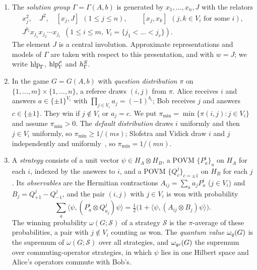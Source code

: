 \begin{definition}\label{def:lcs}
\leavevmode
\begin{enumerate}[label=(\alph*),itemsep=1pt]
\item The \emph{solution group} $\Gamma=\Gamma(A,b)$ is generated by $x_1,\dots,x_n,J$ with the relators
\begin{gather*}
x_j^2,\quad J^2,\quad [x_j,J]\ \ (1\le j\le n),\qquad [x_j,x_k]\ \ (j,k\in V_i\text{ for some }i),\\
J^{b_i}x_{j_1}x_{j_2}\cdots x_{j_r}\ \ (1\le i\le m,\ V_i=\{j_1<\dots<j_r\}).
\end{gather*}
The element $J$ is a central involution. Approximate representations and models of $\Gamma$ are taken with respect to this presentation,
and with $w=J$; we write $\operatorname{hlp}_\Gamma$, $\operatorname{hlp}^{\rho}_\Gamma$ and $h^{S}_\Gamma$.
\item In the game $G=G(A,b)$ with \emph{question distribution} $\pi$ on $\{1,\dots,m\}\times\{1,\dots,n\}$, a referee draws $(i,j)$ from
$\pi$. Alice receives $i$ and answers $a\in\{\pm1\}^{V_i}$ with $\prod_{j\in V_i}a_j=(-1)^{b_i}$; Bob receives $j$ and answers
$c\in\{\pm1\}$. They win if $j\notin V_i$ or $a_j=c$. We put $\pi_{\min}=\min\{\pi(i,j):j\in V_i\}$ and assume $\pi_{\min}>0$. The
\emph{default distribution} draws $i$ uniformly and then $j\in V_i$ uniformly, so $\pi_{\min}\ge1/(ms)$; Slofstra and Vidick draw $i$
and $j$ independently and uniformly~\cite{SV18}, so $\pi_{\min}=1/(mn)$.
\item A \emph{strategy} consists of a unit vector $\psi\in H_A\otimes H_B$, a POVM $\{P^i_a\}_a$ on $H_A$ for each $i$, indexed by the
answers to $i$, and a POVM $\{Q^j_c\}_{c=\pm1}$ on $H_B$ for each $j$. Its \emph{observables} are the Hermitian contractions
$A_{ij}=\sum_aa_jP^i_a$ ($j\in V_i$) and $B_j=Q^j_{+1}-Q^j_{-1}$, and the pair $(i,j)$ with $j\in V_i$ is won with probability
\[
\sum_a\bigl\langle\psi,(P^i_a\otimes Q^j_{a_j})\psi\bigr\rangle=\tfrac12\bigl(1+\langle\psi,(A_{ij}\otimes B_j)\psi\rangle\bigr).
\]
The winning probability $\omega(G;\mathcal S)$ of a strategy $\mathcal S$ is the $\pi$-average of these probabilities, a pair with
$j\notin V_i$ counting as won. The \emph{quantum value} $\omega_{q}(G)$ is the supremum of $\omega(G;\mathcal S)$ over all strategies, and
$\omega_{qc}(G)$ the supremum over commuting-operator strategies, in which $\psi$ lies in one Hilbert space and Alice's operators commute with
Bob's.
\end{enumerate}
\end{definition}

